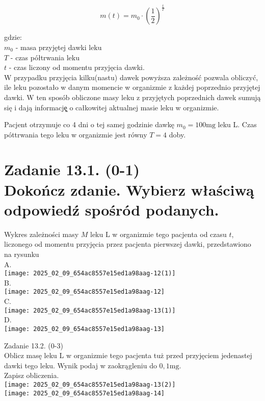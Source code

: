 \documentclass[10pt]{article}
\begin{document}
\[
m(t)=m_{0} \cdot\left(\frac{1}{2}\right)^{\frac{t}{T}}
\]

gdzie:\\
\(m_{0}\) - masa przyjętej dawki leku\\
\(T\) - czas półtrwania leku\\
\(t\) - czas liczony od momentu przyjęcia dawki.\\
W przypadku przyjęcia kilku(nastu) dawek powyższa zależność pozwala obliczyć, ile leku pozostało w danym momencie w organizmie z każdej poprzednio przyjętej dawki. W ten sposób obliczone masy leku z przyjętych poprzednich dawek sumują się i dają informację̨ o całkowitej aktualnej masie leku w organizmie.

Pacjent otrzymuje co 4 dni o tej samej godzinie dawkę \(m_{0}=100 \mathrm{mg}\) leku L. Czas póttrwania tego leku w organizmie jest równy \(T=4\) doby.

\section*{Zadanie 13.1. (0-1) \\
 Dokończ zdanie. Wybierz właściwą odpowiedź spośród podanych.}
Wykres zależności masy \(M\) leku L w organizmie tego pacjenta od czasu \(t\), liczonego od momentu przyjęcia przez pacjenta pierwszej dawki, przedstawiono na rysunku\\
A.\\
\texttt{[image: 2025\_02\_09\_654ac8557e15ed1a98aag-12(1)]}\\
B.\\
\texttt{[image: 2025\_02\_09\_654ac8557e15ed1a98aag-12]}\\
C.\\
\texttt{[image: 2025\_02\_09\_654ac8557e15ed1a98aag-13(1)]}\\
D.\\
\texttt{[image: 2025\_02\_09\_654ac8557e15ed1a98aag-13]}

Zadanie 13.2. (0-3)\\
Oblicz masę leku L w organizmie tego pacjenta tuż przed przyjęciem jedenastej dawki tego leku. Wynik podaj w zaokrągleniu do \(0,1 \mathrm{mg}\).\\
Zapisz obliczenia.\\
\texttt{[image: 2025\_02\_09\_654ac8557e15ed1a98aag-13(2)]}\\
\texttt{[image: 2025\_02\_09\_654ac8557e15ed1a98aag-14]}
\end{document}
